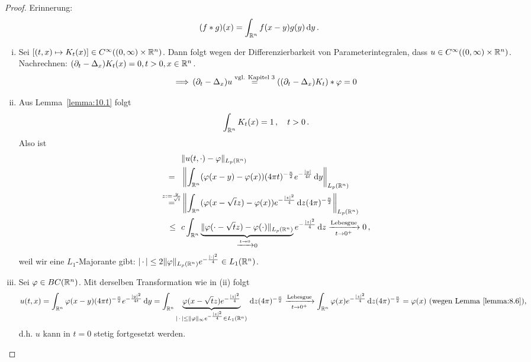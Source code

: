 \begin{proof}
Erinnerung:
\[
	(f\ast g) (x) = \int_{\mathbb{R}^n} f(x-y) g(y) \,\mathrm{d} y \, .
\]
\begin{enumerate}[(i)]
\item Sei $[(t,x) \mapsto K_t(x) ] \in C^\infty ((0,\infty)\times \mathbb{R}^n)$. Dann folgt wegen der Differenzierbarkeit von Parameterintegralen, dass $u \in C^\infty ((0,\infty)\times \mathbb{R}^n)$. Nachrechnen: $ (\partial_t - \Delta_x) K_t(x) = 0, t>0, x \in \mathbb{R}^n$.
\[
	\Longrightarrow \, (\partial_t - \Delta_x)u \stackrel{\scriptsize\text{vgl. Kapitel 3}}= ((\partial_t-\Delta_x)K_t)\ast \varphi = 0 
\]
\item Aus Lemma~\ref{lemma:10.1} folgt
\[
	\int_{\mathbb{R}^n} K_t (x) = 1 \, , \quad t > 0 \, .
\]
Also ist
\begin{align*}
	& \lVert u(t,\cdot) - \varphi\rVert_{L_p(\mathbb{R}^n)} \\
	  =\hspace{0.75em} & \left\lVert \int_{\mathbb{R}^n} (\varphi (x-y ) - \varphi (x)) (4\pi t)^{-\frac n2} e^{-\frac{\lvert y\rvert}{4t}} \,\mathrm{d} y\right\rVert_{L_p(\mathbb{R}^n)} \\
	\stackrel{z := \frac y{\sqrt t}}= & \left\lVert \int_{\mathbb{R}^n} (\varphi (x-\sqrt t z) - \varphi(x)) e^{-\frac{\lvert z\rvert^2}4} \,\mathrm{d} z (4\pi)^{-\frac n2}\right\rVert_{L_p(\mathbb{R}^n)}  \\
	\leq \hspace{0.65em}& c \int_{\mathbb{R}^n} \underbrace{\lVert \varphi (\cdot - \sqrt t z)-\varphi(\cdot)\rVert_{L_p(\mathbb{R}^n)}}_{\xrightarrow{t\rightarrow 0} 0} e^{-\frac{\lvert z\rvert^2}4} \,\mathrm{d} z \xrightarrow[t \rightarrow 0^+]{\scriptsize\text{Lebesgue}} 0 \, , 
\end{align*}
weil wir eine $L_1$-Majorante gibt: $\lvert \,\cdot\,\rvert \leq 2 \lVert \varphi\rVert_{L_p(\mathbb{R}^n)} e^{-\frac{\lvert \cdot\rvert^2}4} \in L_1(\mathbb{R}^n)$.
\item Sei $\varphi \in BC(\mathbb{R}^n)$. Mit derselben Transformation wie in (ii) folgt
\begin{dmath*}
	u(t,x) = \int_{\R^n} \varphi(x-y) (4\pi t)^{-\frac n2} e^{-\frac{\abs y^2}{4t}} \d y 
	= \int_{\R^n} \underbrace{\varphi(x-\sqrt t z) e^{-\frac{\abs z^2}4}}_{\abs{\, \cdot\,} \leq \norm\varphi_\infty e^{-\frac{\abs z^2}4} \in L_1(\R^n)} \d z (4 \pi)^{-\frac n2}\\ 
	\xrightarrow[t\rightarrow 0^+]{\scriptsize\text{Lebesgue}} \int_{\R^n}\varphi(x) e^{-\frac{\abs z^2}4} \d z (4\pi)^{-\frac n2} = \varphi(x) \text{ (wegen Lemma~\ref{lemma:8.6})},
\end{dmath*}
d.h. $u$ kann in $t=0$ stetig fortgesetzt werden. \qedhere
\end{enumerate}
\end{proof}

